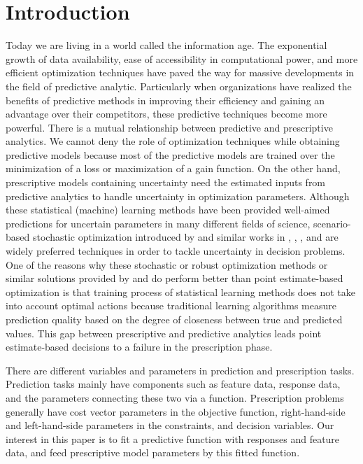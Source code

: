 \documentclass[12pt]{article}
\begin{document}
\section{Introduction}
Today we are living in a world called the information age. The exponential growth of data availability, ease of accessibility in computational power, and more efficient optimization techniques have paved the way for massive developments in the field of predictive analytic. Particularly when organizations have realized the benefits of predictive methods in improving their efficiency and gaining an advantage over their competitors, these predictive techniques become more powerful. There is a mutual relationship between predictive and prescriptive analytics. We cannot deny the role of optimization techniques while obtaining predictive models because most of the predictive models are trained over the minimization of a loss or maximization of a gain function. On the other hand, prescriptive models containing uncertainty need the estimated inputs from predictive analytics to handle uncertainty in optimization parameters. Although these statistical (machine) learning methods have been provided well-aimed predictions for uncertain parameters in many different fields of science, scenario-based stochastic optimization introduced by \cite{RePEc:inm:ormnsc:v:1:y:1955:i:3-4:p:197-206} and similar works in \cite{10.5555/2031490}, \cite{SHAPIRO2003353}, \cite{doi:10.1137/S1052623499363220}, and \cite{Shapiro2005} are widely preferred techniques in order to tackle uncertainty in decision problems. One of the reasons why these stochastic or robust optimization methods or similar solutions provided by \cite{BEN:09} and \cite{doi:10.1137/080734510} do perform better than point estimate-based optimization is that training process of statistical learning methods does not take into account optimal actions because traditional learning algorithms measure prediction quality based on the degree of closeness between true and predicted values. This gap between prescriptive and predictive analytics leads point estimate-based decisions to a failure in the prescription phase.

There are different variables and parameters in prediction and prescription tasks. Prediction tasks mainly have components such as feature data, response data, and the parameters connecting these two via a function. Prescription problems generally have cost vector parameters in the objective function, right-hand-side and left-hand-side parameters in the constraints, and decision variables. Our interest in this paper is to fit a predictive function with responses and feature data, and feed prescriptive model parameters by this fitted function.
\end{document}

